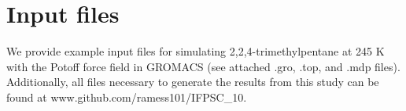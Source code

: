 \documentclass[preprint,review,12pt]{elsarticle}
\begin{document}
\begin{frontmatter}
%			
%			
%			
%			
%		
%			
%			
%			
%			
		
	\end{frontmatter}	
	
	
	\section{Input files} \label{Gromacs input files}
	
	We provide example input files for simulating 2,2,4-trimethylpentane at 245 K with the Potoff force field in GROMACS (see attached .gro, .top, and .mdp files). Additionally, all files necessary to generate the results from this study can be found at \newline www.github.com/ramess101/IFPSC\_10.
	
	
\end{document}
